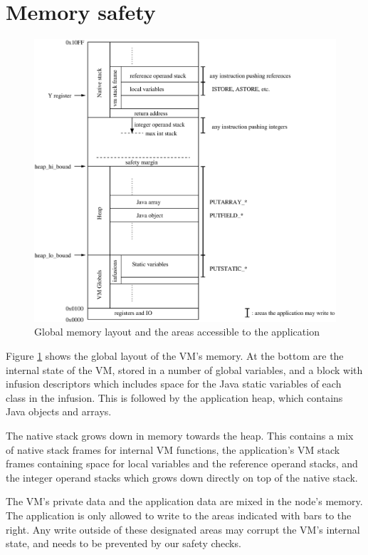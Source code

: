 \section{Memory safety}

\begin{figure}
\includegraphics[width=\linewidth]{memlayout.eps}
\caption{Global memory layout and the areas accessible to the application}
\label{fig-memlayout}
\end{figure}

Figure \ref{fig-memlayout} shows the global layout of the VM's memory. At the bottom are the internal state of the VM, stored in a number of global variables, and a block with infusion descriptors which includes space for the Java static variables of each class in the infusion. This is followed by the application heap, which contains Java objects and arrays.

The native stack grows down in memory towards the heap. This contains a mix of native stack frames for internal VM functions, the application's VM stack frames containing space for local variables and the reference operand stacks, and the integer operand stacks which grows down directly on top of the native stack.

The VM's private data and the application data are mixed in the node's memory. The application is only allowed to write to the areas indicated with bars to the right. Any write outside of these designated areas may corrupt the VM's internal state, and needs to be prevented by our safety checks.

